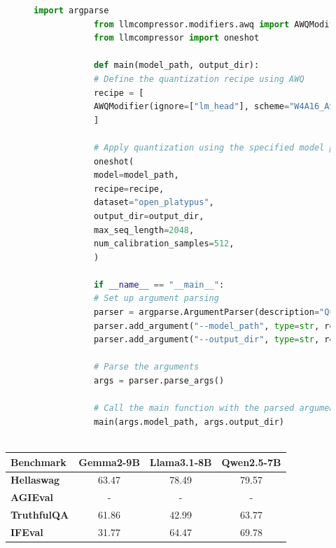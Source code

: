 \documentclass{ifacconf}
\begin{document}
	\begin{figure}[H]
		\centering
		\begin{lstlisting}[language=python,numbers=none]
			import argparse
			from llmcompressor.modifiers.awq import AWQModifier
			from llmcompressor import oneshot
			
			def main(model_path, output_dir):
			# Define the quantization recipe using AWQ
			recipe = [
			AWQModifier(ignore=["lm_head"], scheme="W4A16_ASYM", targets=["Linear"]),
			]
			
			# Apply quantization using the specified model path and output directory
			oneshot(
			model=model_path,
			recipe=recipe,
			dataset="open_platypus",
			output_dir=output_dir,
			max_seq_length=2048,
			num_calibration_samples=512,
			)
			
			if __name__ == "__main__":
			# Set up argument parsing
			parser = argparse.ArgumentParser(description="Quantize an LLM model using AWQ.")
			parser.add_argument("--model_path", type=str, required=True, help="Path to the local model directory.")
			parser.add_argument("--output_dir", type=str, required=True, help="Directory to save the quantized model.")
			
			# Parse the arguments
			args = parser.parse_args()
			
			# Call the main function with the parsed arguments
			main(args.model_path, args.output_dir)
			
		\end{lstlisting}
		\label{awq-script}
	\end{figure}
	
	\begin{table}[H]
		\centering
		\begin{tabular}{|l|c|c|c|}
			\hline
			\multirow{1}{*}{\textbf{Benchmark}} & \textbf{Gemma2-9B} & \textbf{Llama3.1-8B} & \textbf{Qwen2.5-7B} \\ \hline
			\textbf{Hellaswag}                & 63.47            & 78.49              & 79.57              \\ \hline
			\textbf{AGIEval}                  & -            & -              & -              \\ \hline
			\textbf{TruthfulQA}               & 61.86            & 42.99              & 63.77              \\ \hline
			\textbf{IFEval}                   & 31.77            & 64.47              & 69.78              \\ \hline
		\end{tabular}
		\label{tab:awq_results}
	\end{table}
	
\end{document}
